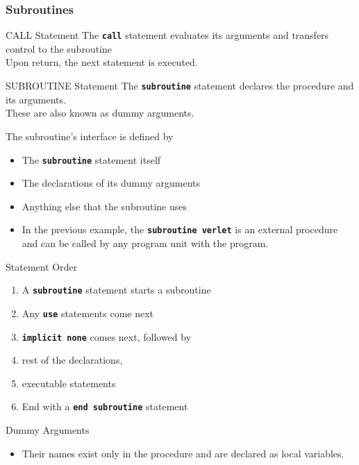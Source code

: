 \documentclass[slidestop,mathserif,compress,xcolor=svgnames]{beamer}
\begin{document}
\begin{frame}
  \frametitle{\small Subroutines}

  \begin{block}{\scriptsize CALL Statement}
    The \texttt{\textbf{call}} statement evaluates its arguments and transfers control to the subroutine\\
    Upon return, the next statement is executed.
  \end{block}
  \begin{block}{\scriptsize SUBROUTINE Statement}
    The \texttt{\textbf{subroutine}} statement declares the procedure and its arguments.\\
    These are also known as dummy arguments.
  \end{block}
  \begin{block}{}
    The subroutine's interface is defined by
    \begin{itemize}
      \item The \texttt{\textbf{subroutine}} statement itself
      \item The declarations of its dummy arguments
      \item Anything else that the subroutine uses
      \item In the previous example, the \textbf{\texttt{subroutine verlet}} is an external procedure and can be called by any program unit with the program.
    \end{itemize}
  \end{block}
  \begin{block}{\scriptsize Statement Order}
    \begin{enumerate}
      \item A \texttt{\textbf{subroutine}} statement starts a subroutine
      \item Any \texttt{\textbf{use}} statements come next
      \item \texttt{\textbf{implicit none}} comes next, followed by
      \item rest of the declarations,
      \item executable statements
      \item End with a \texttt{\textbf{end subroutine}} statement
    \end{enumerate}
  \end{block}
  \begin{block}{\scriptsize Dummy Arguments}
    \begin{itemize}
      \item Their names exist only in the procedure and are declared as local variables.

\end{itemize}
\end{block}
\end{frame}
\end{document}
